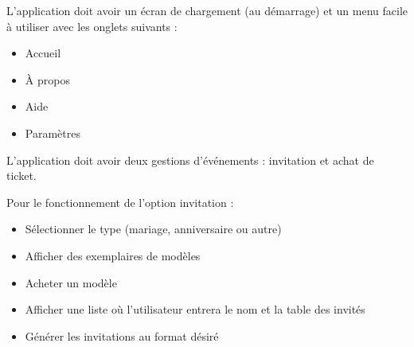 \documentclass{article}
\begin{document}
L'application doit avoir un écran de chargement (au démarrage) et un menu facile à utiliser avec les onglets suivants :
\begin{itemize}
    \item Accueil
    \item À propos
    \item Aide
    \item Paramètres
\end{itemize}

L'application doit avoir deux gestions d'événements : invitation et achat de ticket.

Pour le fonctionnement de l'option invitation :
\begin{itemize}
    \item Sélectionner le type (mariage, anniversaire ou autre)
    \item Afficher des exemplaires de modèles
    \item Acheter un modèle
    \item Afficher une liste où l'utilisateur entrera le nom et la table des invités
    \item Générer les invitations au format désiré
\end{itemize}
\end{document}
